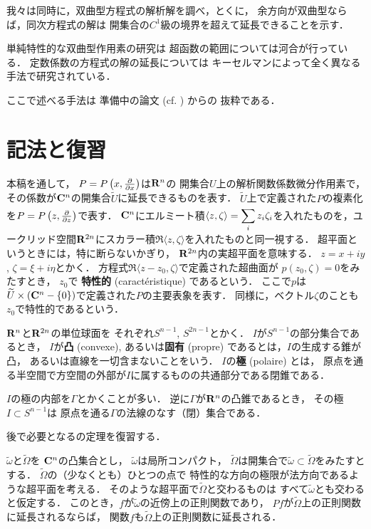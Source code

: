 我々は同時に，双曲型方程式の解析解を調べ，とくに，
余方向が双曲型ならば，同次方程式の解は
開集合の\(C^1\)級の境界を超えて延長できることを示す．

単純特性的な双曲型作用素の研究は
超函数の範囲については河合\cite{7}が行っている．
定数係数の方程式の解の延長については
キーセルマン\cite{8}によって全く異なる手法で研究されている．

ここで述べる手法は
準備中の論文 (cf. \cite{BS72a} \cite{BS72b} \cite{3} \cite{4}) からの
抜粋である．

\section{記法と復習}

本稿を通して，
\(P=P\left(x,\frac{\partial}{\partial{x}}\right)\)は\(\mathbf{R}^n\)の
開集合\(U\)上の解析関数係数微分作用素で，
その係数が\(\mathbf{C}^n\)の開集合\(\widetilde{U}\)に延長できるものを表す．
\(\widetilde{U}\)上で定義された\(P\)の複素化を\(
    P=P\left(z,\frac{\partial}{\partial z}\right)
\)で表す．
\(\mathbf{C}^n\)にエルミート積\(\displaystyle
    \langle z,\zeta\rangle=\sum_{i}^{}z_i\zeta_i
\)を入れたものを，ユークリッド空間\(\mathbf{R}^{2n}\)にスカラー積\(
    \Re\langle z,\zeta\rangle
\)を入れたものと同一視する．
超平面というときには，特に断らないかぎり，
\(\mathbf{R}^{2n}\)内の実超平面を意味する．
\(z=x+iy\), \(\zeta=\xi+i\eta\)とかく．
方程式\(\Re\langle z-z_0,\zeta\rangle\)で定義された超曲面が
\(p(z_0,\zeta)=0\)をみたすとき，
\(z_0\)で
\textbf{特性的} (caract\'eristique) であるという．
ここで\(p\)は\(
    \widetilde{U}\times\left(\mathbf{C}^n-\{0\}\right)
\)で定義された\(P\)の主要表象を表す．
同様に，ベクトル\(\zeta\)のことも\(z_0\)で特性的であるという．

\(\mathbf{R}^n\)と\(\mathbf{R}^{2n}\)の単位球面を
それぞれ\(S^{n-1}\), \(S^{2n-1}\)とかく．
\(I\)が\(S^{n-1}\)の部分集合であるとき，
\(I\)が\textbf{凸} (convexe), 
あるいは\textbf{固有} (propre) であるとは，\(I\)の生成する錐が凸，
あるいは直線を一切含まないことをいう．
\(I\)の\textbf{極} (polaire) とは，
原点を通る半空間で方空間の外部が\(I\)に属するものの共通部分である閉錐である．

\(I\)の極の内部を\(\varGamma\)とかくことが多い．
逆に\(\varGamma\)が\(\mathbf{R}^n\)の凸錐であるとき，
その極\(I\subset S^{n-1}\)は
原点を通る\(\varGamma\)の法線のなす（閉）集合である．

後で必要となる\cite{3}の定理を復習する．

\begin{THM}\label{thm11}
    \(\widetilde{\omega}\)と\(\widetilde{\varOmega}\)を
    \(\mathbf{C}^n\)の凸集合とし，
    \(\widetilde{\omega}\)は局所コンパクト，
    \(\widetilde{\varOmega}\)は開集合で\(
        \widetilde{\omega}\subset\widetilde{\varOmega}
    \)をみたすとする．
    \(\widetilde{\varOmega}\)の（少なくとも）ひとつの点で
    特性的な方向の極限が法方向であるような超平面を考える．
    そのような超平面で\(\widetilde{\varOmega}\)と交わるものは
    すべて\(\widetilde{\omega}\)とも交わると仮定する．
    このとき，\(f\)が\(\widetilde{\omega}\)の近傍上の正則関数であり，
    \(Pf\)が\(\widetilde{\varOmega}\)上の正則関数に延長されるならば，
    関数\(f\)も\(\widetilde{\varOmega}\)上の正則関数に延長される．
\end{THM}

